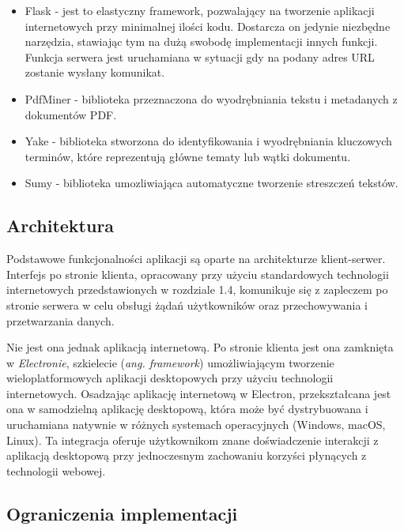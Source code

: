 \documentclass[12pt,a4paper,twoside]{article}
\begin{document}
\begin{itemize}
	\item Flask - jest to elastyczny framework, pozwalający na tworzenie aplikacji internetowych przy minimalnej ilości kodu. Dostarcza on jedynie niezbędne narzędzia, stawiając tym na dużą swobodę implementacji innych funkcji. Funkcja serwera jest uruchamiana w sytuacji gdy na podany adres URL zostanie wysłany komunikat.
	\item PdfMiner - biblioteka przeznaczona do wyodrębniania tekstu i metadanych z dokumentów PDF. 
	\item Yake - biblioteka stworzona do identyfikowania i wyodrębniania kluczowych terminów, które reprezentują główne tematy lub wątki dokumentu.
	\item Sumy - biblioteka umozliwiająca automatyczne tworzenie streszczeń tekstów.
\end{itemize}
\subsection{Architektura}
Podstawowe funkcjonalności aplikacji są oparte na architekturze klient-serwer. Interfejs po stronie klienta, opracowany przy użyciu standardowych technologii internetowych przedstawionych w rozdziale 1.4, komunikuje się z zapleczem po stronie serwera w celu obsługi żądań użytkowników oraz przechowywania i przetwarzania danych.\par
Nie jest ona jednak aplikacją internetową. Po stronie klienta jest ona zamknięta w \textit{Electronie}, szkielecie (\textit{ang. framework}) umożliwiającym tworzenie wieloplatformowych aplikacji desktopowych przy użyciu technologii internetowych. Osadzając aplikację internetową w Electron, przekształcana jest ona w samodzielną aplikację desktopową, która może być dystrybuowana i uruchamiana natywnie w różnych systemach operacyjnych (Windows, macOS, Linux). Ta integracja oferuje użytkownikom znane doświadczenie interakcji z aplikacją desktopową przy jednoczesnym zachowaniu korzyści płynących z technologii webowej.
\subsection{Ograniczenia implementacji}
\end{document}
